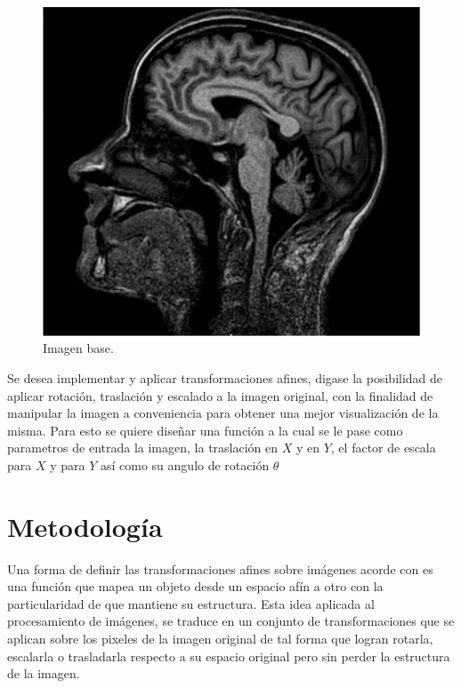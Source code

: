 \documentclass[11pt, letterpaper]{article}
\begin{document}
\begin{figure}[h!]
	\centering
	\begin{minipage}{0.8\textwidth}
		\centering
		\includegraphics[width=\textwidth]{IMG/F1.jpg}
		\caption{Imagen base.}
		\label{fig:f1}
	\end{minipage}\hfill
\end{figure}

Se desea implementar y aplicar transformaciones afines, digase la posibilidad de aplicar rotación, traslación y escalado a la imagen original, con la finalidad de manipular la imagen a conveniencia para obtener una mejor visualización de la misma. Para esto se quiere diseñar una función a la cual se le pase como parametros de entrada la imagen, la traslación en $X$ y en $Y$, el factor de escala para $X$ y para $Y$ así como su angulo de rotación $\theta$




	
\newpage
	
\section{Metodología}
	
Una forma de definir las transformaciones afines sobre imágenes acorde con \cite{coste2012image} es una función que mapea un objeto desde un espacio afín a otro con la particularidad de que mantiene su estructura. Esta idea aplicada al procesamiento de imágenes, se traduce en un conjunto de transformaciones que se aplican sobre los pixeles de la imagen original de tal forma que logran rotarla, escalarla o trasladarla respecto a su espacio original pero sin perder la estructura de la imagen.
\end{document}

